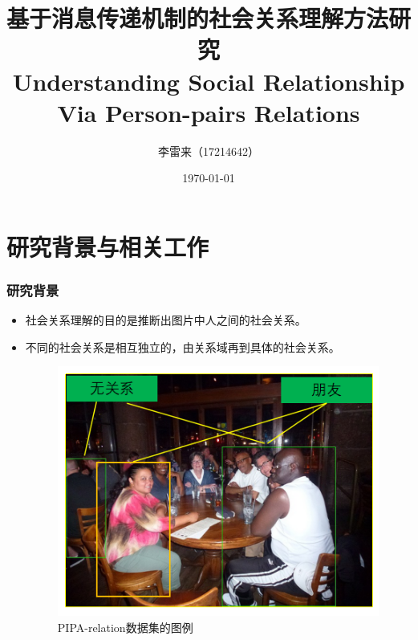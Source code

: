 \documentclass[UTF8]{beamer}
\begin{document}
    \title{基于消息传递机制的社会关系理解方法研究\\
        Understanding Social Relationship Via Person-pairs Relations
    }
    \author{李雷来（17214642）}
    \date{\today}
    \frame{\titlepage}

\section{研究背景与相关工作}

\begin{frame}
\frametitle{研究背景}
    \begin{itemize}
       \item 社会关系理解的目的是推断出图片中人之间的社会关系。
       \item 不同的社会关系是相互独立的，由关系域再到具体的社会关系。
       \begin{figure}[htpb]
        	\centering
            	\includegraphics[width=0.58 \textwidth,clip]{images/example-1.png}
            	\vspace*{0.5mm}
                \caption{PIPA-relation数据集\cite{sun2017a}的图例}
        	\label{fig:exp-statistic}
    \end{figure}
    \end{itemize}
\end{frame}
\end{document}
